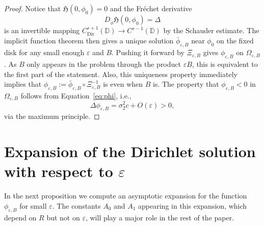 \documentclass[12pt,reqno]{amsart}
\numberwithin{equation}{section}
\theoremstyle{definition}
\theoremstyle{remark}
\begin{document}
\begin{proof}
Notice that $\mathfrak H(0,\phi_0)=0$ and the Fr\'echet derivative
\[
D_{\bar\phi} \mathfrak H(0,\phi_0) = \Delta
\]
is an invertible mapping $C^{s+1}_{\mathrm{Dir}}(\mathbb{D}) \to C^{s-1}(\mathbb{D})$ by the Schauder estimate. The implicit function theorem then gives a unique solution $\bar\phi_{\varepsilon,B}$ near $\phi_0$ on the fixed disk for any small enough $\varepsilon$ and $B$.  Pushing it forward by $\Xi_{\varepsilon,B}$ gives $\phi_{\varepsilon,B}$ on $\varOmega_{\varepsilon,B}$.   
As $B$ only appears in the problem through the product $\varepsilon B$, this is equivalent to the first part of the statement.
Also, this uniqueness property immediately implies that $\phi_{\varepsilon,B} := \bar\phi_{\varepsilon,B} \circ \Xi_{\varepsilon,B}^{-1}$ is even when $B$ is.
The property that $\phi_{\varepsilon,B}<0$ in $\varOmega_{\varepsilon,B}$ follows from Equation~\eqref{eq:phi}, i.e.,
\[
\Delta\phi_{\varepsilon,B} = \sigma_2^2c+  O(\varepsilon) > 0 ,
\]
via the maximum principle.	
	
\end{proof}

 

\section{Expansion of the Dirichlet solution with respect to $\varepsilon$}\label{sec:phi-expansion}

In the next proposition we compute an asymptotic expansion for the function $\phi_{\varepsilon,B}$ for small $\varepsilon$.
The constants $A_0$ and $A_1$ appearing in this expansion, which depend on $R$ but not on $\varepsilon$, will play a major role in the rest of the paper.
\end{document}
